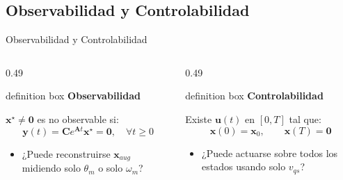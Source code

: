 \documentclass[aspectratio=169,t]{beamer}
\newcommand{\definitionbox}[2]{%
  \begin{beamercolorbox}[wd=\linewidth,sep=0.9ex,leftskip=0.9ex,rightskip=0.9ex]{definition box}%
    {\small\bfseries\color{uncBlue}#1}\par\vspace{0.2mm}%
    {\small #2}%
  \end{beamercolorbox}%
}
\begin{document}
\subsection{Observabilidad y Controlabilidad}
\begin{frame}{Observabilidad y Controlabilidad}
\vspace{2mm}
\begin{columns}[T,onlytextwidth]

\begin{column}{0.49\textwidth}
\definitionbox{Observabilidad}{
$\bm{x}^\star\neq\bm{0}$ es no observable si:
\[
\bm{y}(t)=\bm{C}e^{\bm{A}t}\bm{x}^\star=\bm{0},\quad \forall t\geq0
\]

}
\vspace{2mm}
\begin{itemize}
  \item ¿Puede reconstruirse $\bm{x}_{aug}$ midiendo solo $\theta_m$ o solo $\omega_m$?
\end{itemize}
\end{column}

\begin{column}{0.49\textwidth}
\definitionbox{Controlabilidad}{
Existe $\bm{u}(t)$ en $[0,T]$ tal que:
\[
\bm{x}(0)=\bm{x}_0,\qquad \bm{x}(T)=\bm{0}
\]

}

\vspace{2mm}
\begin{itemize}
  \item ¿Puede actuarse sobre todos los estados usando solo $v_{qs}$?
\end{itemize}
\end{column}

\end{columns}

\end{frame}
\end{document}
